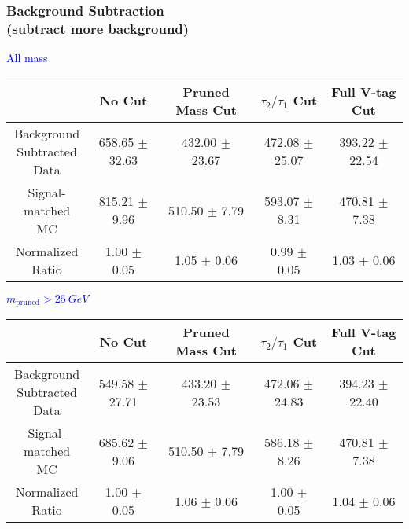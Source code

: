 \documentclass{beamer}
\begin{document}
\begin{frame}
  \frametitle{Background Subtraction \\ (subtract more background)}
  \begin{adjustwidth}{-1.5em}{-1.5em}
    \centering
    \vspace{6pt}
    \textcolor{blue}{All mass}
    \vspace{6pt}

    {\scriptsize
      \begin{tabular}{c | c | c | c | c}
        \hline
        & No Cut & Pruned Mass Cut & $\tau_2/\tau_1$ Cut & Full V-tag Cut \\
        \hline
        \makecell{Background \\ Subtracted \\ Data} & 658.65 $\pm$ 32.63 & 432.00 $\pm$ 23.67 & 472.08 $\pm$ 25.07 & 393.22 $\pm$ 22.54 \\
        \makecell{Signal-\\ matched MC} & 815.21 $\pm$ 9.96 & 510.50 $\pm$ 7.79 & 593.07 $\pm$ 8.31 & 470.81 $\pm$ 7.38 \\
        \hline
        \makecell{Normalized \\ Ratio} & 1.00 $\pm$ 0.05 & 1.05 $\pm$ 0.06 & 0.99 $\pm$ 0.05 & 1.03 $\pm$ 0.06 \\
        \hline
      \end{tabular}
    }

    \vspace{6pt}
    \textcolor{blue}{$m_\text{pruned} > \SI{25}{GeV}$}
    \vspace{6pt}

    {\scriptsize
      \begin{tabular}{c | c | c | c | c}
        \hline
        & No Cut & Pruned Mass Cut & $\tau_2/\tau_1$ Cut & Full V-tag Cut \\
        \hline
        \makecell{Background \\ Subtracted \\ Data} & 549.58 $\pm$ 27.71 & 433.20 $\pm$ 23.53 & 472.06 $\pm$ 24.83 & 394.23 $\pm$ 22.40 \\
        \makecell{Signal-\\ matched MC} & 685.62 $\pm$ 9.06 & 510.50 $\pm$ 7.79 & 586.18 $\pm$ 8.26 & 470.81 $\pm$ 7.38 \\
        \hline
        \makecell{Normalized \\ Ratio} & 1.00 $\pm$ 0.05 & 1.06 $\pm$ 0.06 & 1.00 $\pm$ 0.05 & 1.04 $\pm$ 0.06 \\
        \hline
      \end{tabular}
    }
  \end{adjustwidth}
\end{frame}
\end{document}
